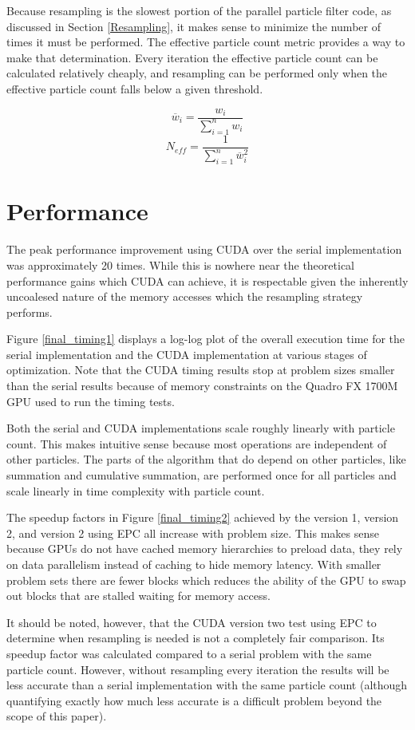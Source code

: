 \documentclass{article}
\begin{document}
Because resampling is the slowest portion of the parallel particle filter code, as discussed in Section \ref{Resampling}, it makes sense to minimize the number of times it must be performed. The effective particle count metric provides a way to make that determination. Every iteration the effective particle count can be calculated relatively cheaply, and resampling can be performed only when the effective particle count falls below a given threshold.

\[\overline{w}_{i} = \frac{w_{i}}{\sum_{i=1}^{n} w_{i}}\]
\begin{equation}\label{epc}
N_{eff} = \frac{1}{\sum_{i=1}^{n} \overline{w}_{i}^2}
\end{equation}

\section{Performance}
The peak performance improvement using CUDA over the serial implementation was approximately 20 times. While this is nowhere near the theoretical performance gains which CUDA can achieve, it is respectable given the inherently uncoalesed nature of the memory accesses which the resampling strategy performs.

Figure \ref{final_timing1} displays a log-log plot of the overall execution time for the serial implementation and the CUDA implementation at various stages of optimization. Note that the CUDA timing results stop at problem sizes smaller than the serial results because of memory constraints on the Quadro FX 1700M GPU used to run the timing tests.

Both the serial and CUDA implementations scale roughly linearly with particle count. This makes intuitive sense because most operations are independent of other particles. The parts of the algorithm that do depend on other particles, like summation and cumulative summation, are performed once for all particles and scale linearly in time complexity with particle count.

The speedup factors in Figure \ref{final_timing2} achieved by the version 1, version 2, and version 2 using EPC all increase with problem size. This makes sense because GPUs do not have cached memory hierarchies to preload data, they rely on data parallelism instead of caching to hide memory latency. With smaller problem sets there are fewer blocks which reduces the ability of the GPU to swap out blocks that are stalled waiting for memory access.

It should be noted, however, that the CUDA version two test using EPC to determine when resampling is needed is not a completely fair comparison. Its speedup factor was calculated compared to a serial problem with the same particle count. However, without resampling every iteration the results will be less accurate than a serial implementation with the same particle count (although quantifying exactly how much less accurate is a difficult problem beyond the scope of this paper).
\end{document}
